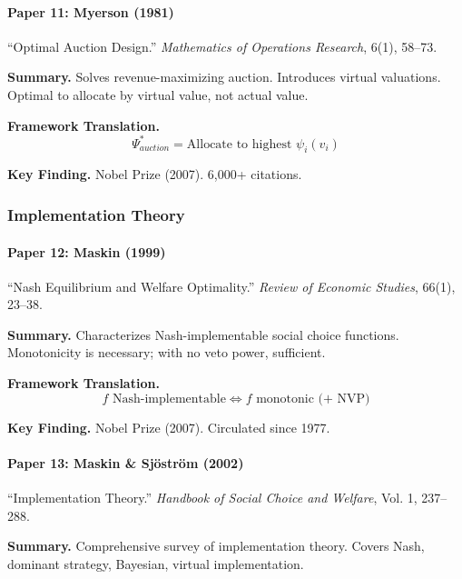 \paragraph{Paper 11: Myerson (1981)}

``Optimal Auction Design.''
\textit{Mathematics of Operations Research}, 6(1), 58--73.

\textbf{Summary.}
Solves revenue-maximizing auction. Introduces virtual valuations.
Optimal to allocate by virtual value, not actual value.

\textbf{Framework Translation.}
\begin{equation}
\Psi^*_{auction} = \text{Allocate to highest } \psi_i(v_i)
\end{equation}

\textbf{Key Finding.}
Nobel Prize (2007). 6,000+ citations.

\subsubsection{Implementation Theory}

\paragraph{Paper 12: Maskin (1999)}

``Nash Equilibrium and Welfare Optimality.''
\textit{Review of Economic Studies}, 66(1), 23--38.

\textbf{Summary.}
Characterizes Nash-implementable social choice functions.
Monotonicity is necessary; with no veto power, sufficient.

\textbf{Framework Translation.}
\begin{equation}
f \text{ Nash-implementable} \Leftrightarrow f \text{ monotonic (+ NVP)}
\end{equation}

\textbf{Key Finding.}
Nobel Prize (2007). Circulated since 1977.

\paragraph{Paper 13: Maskin \& Sjöström (2002)}

``Implementation Theory.''
\textit{Handbook of Social Choice and Welfare}, Vol. 1, 237--288.

\textbf{Summary.}
Comprehensive survey of implementation theory. Covers Nash, dominant 
strategy, Bayesian, virtual implementation.

